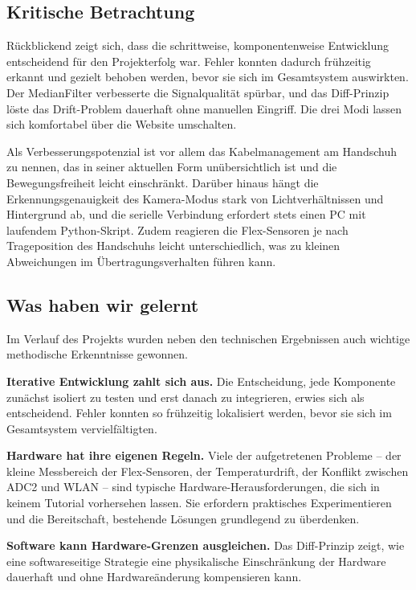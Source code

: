 \documentclass[12pt,a4paper]{article}
\begin{document}
\subsection{Kritische Betrachtung}

Rückblickend zeigt sich, dass die schrittweise, komponentenweise Entwicklung entscheidend für den Projekterfolg war. Fehler konnten dadurch frühzeitig erkannt und gezielt behoben werden, bevor sie sich im Gesamtsystem auswirkten. Der MedianFilter verbesserte die Signalqualität spürbar, und das Diff-Prinzip löste das Drift-Problem dauerhaft ohne manuellen Eingriff. Die drei Modi lassen sich komfortabel über die Website umschalten.

Als Verbesserungspotenzial ist vor allem das Kabelmanagement am Handschuh zu nennen, das in seiner aktuellen Form unübersichtlich ist und die Bewegungsfreiheit leicht einschränkt. Darüber hinaus hängt die Erkennungsgenauigkeit des Kamera-Modus stark von Lichtverhältnissen und Hintergrund ab, und die serielle Verbindung erfordert stets einen PC mit laufendem Python-Skript. Zudem reagieren die Flex-Sensoren je nach Trageposition des Handschuhs leicht unterschiedlich, was zu kleinen Abweichungen im Übertragungsverhalten führen kann.

\subsection{Was haben wir gelernt}

Im Verlauf des Projekts wurden neben den technischen Ergebnissen auch wichtige methodische Erkenntnisse gewonnen.

\textbf{Iterative Entwicklung zahlt sich aus.} Die Entscheidung, jede Komponente zunächst isoliert zu testen und erst danach zu integrieren, erwies sich als entscheidend. Fehler konnten so frühzeitig lokalisiert werden, bevor sie sich im Gesamtsystem vervielfältigten.

\textbf{Hardware hat ihre eigenen Regeln.} Viele der aufgetretenen Probleme -- der kleine Messbereich der Flex-Sensoren, der Temperaturdrift, der Konflikt zwischen ADC2 und WLAN -- sind typische Hardware-Herausforderungen, die sich in keinem Tutorial vorhersehen lassen. Sie erfordern praktisches Experimentieren und die Bereitschaft, bestehende Lösungen grundlegend zu überdenken.

\textbf{Software kann Hardware-Grenzen ausgleichen.} Das Diff-Prinzip zeigt, wie eine softwareseitige Strategie eine physikalische Einschränkung der Hardware dauerhaft und ohne Hardwareänderung kompensieren kann.
\end{document}
